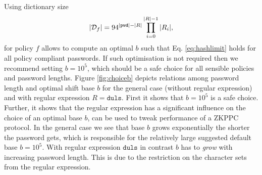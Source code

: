 Using dictionary size 
\[|\mathcal{D}_f|=94^{|\mathtt{pwd}|-|R|}\prod_{i=0}^{|R|-1}|R_i|,\]
for policy $f$ allows to compute an optimal $b$ such that Eq. \ref{eq:hashlimit} holds for all policy compliant passwords.
If such optimisation is not required then we recommend setting $b=10^5$, which should be a safe choice for all sensible policies and password lengths.
Figure \ref{fig:choiceb} depicts relations among password length and optimal shift base $b$ for the general case (without regular expression) and with regular expression $R=\mathtt{duls}$.
First it shows that $b=10^5$ is a safe choice.
Further, it shows that the regular expression has a significant influence on the choice of an optimal base $b$, \ie can be used to tweak performance of a ZKPPC protocol.
In the general case we see that base $b$ grows exponentially the shorter the password gets, which is responsible for the relatively large suggested default base $b=10^5$.
With regular expression $\mathtt{duls}$ in contrast $b$ has to \emph{grow} with increasing password length.
This is due to the restriction on the character sets from the regular expression.


